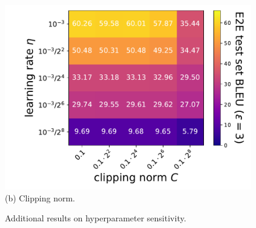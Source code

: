 \begin{figure}[H]
\begin{center}
\begin{minipage}[t]{0.48\linewidth}
{\includegraphics[width=0.96\textwidth]{figs/cn_vs_lr_BLEU.pdf}} \\ \vspace{-0.10cm}
(b) Clipping norm. 
\end{minipage}
\end{center}
\caption{Additional results on hyperparameter sensitivity.}
\label{fig:app_hyperparameter}
\end{figure}
